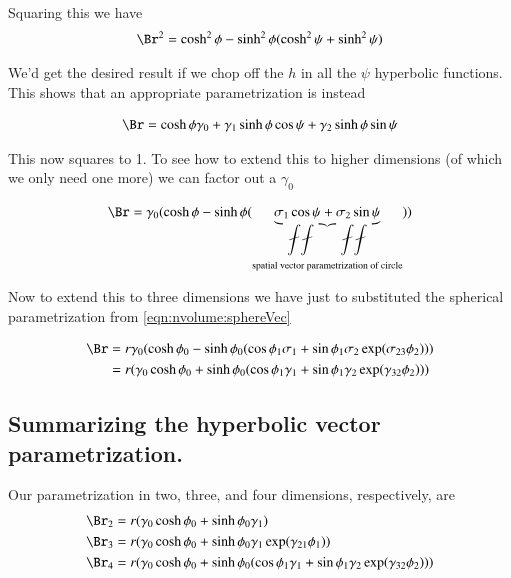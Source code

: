 Squaring this we have
\begin{align*}
\Br^2
&= \cosh^2 \phi - \sinh^2\phi (\cosh^2 \psi + \sinh^2\psi) \\
\end{align*}

We'd get the desired result if we chop off the $h$ in all the $\psi$ hyperbolic functions.  This
shows that an appropriate parametrization is instead

\begin{align*}
\Br 
&= \cosh \phi \gamma_0 + \gamma_1 \sinh\phi \cos\psi + \gamma_2 \sinh\phi \sin\psi \\
\end{align*}

This now squares to 1.  To see how to extend this to higher dimensions (of which we only need one more)
we can factor out a $\gamma_0$

\begin{align*}
\Br 
&= \gamma_0 (\cosh \phi - \sinh\phi (\underbrace{\sigma_1 \cos\psi + \sigma_2 \sin\psi}_{\text{spatial vector parametrization of circle}}) ) \\
\end{align*}

Now to extend this to three dimensions we have just to substituted the spherical parametrization from \ref{eqn:nvolume:sphereVec}

\begin{align*}
\Br 
&= r \gamma_0 (\cosh \phi_0 - \sinh\phi_0 ( \cos\phi_1 \sigma_1 + \sin\phi_1 \sigma_2 \exp( \sigma_{23} \phi_2 )) ) \\
&= r (\gamma_0 \cosh \phi_0 + \sinh\phi_0 ( \cos\phi_1 \gamma_1 + \sin\phi_1 \gamma_2 \exp( \gamma_{32} \phi_2 )) ) \\
\end{align*}

\subsection{Summarizing the hyperbolic vector parametrization. }

Our parametrization in two, three, and four dimensions, respectively, are
\begin{align*}
\Br_2 &= r (\gamma_0 \cosh \phi_0 + \sinh\phi_0 \gamma_1) \\
\Br_3 &= r (\gamma_0 \cosh \phi_0 + \sinh\phi_0 \gamma_1 \exp( \gamma_{21} \phi_1 ) ) \\
\Br_4 &= r (\gamma_0 \cosh \phi_0 + \sinh\phi_0 ( \cos\phi_1 \gamma_1 + \sin\phi_1 \gamma_2 \exp( \gamma_{32} \phi_2 )) )
\end{align*}

